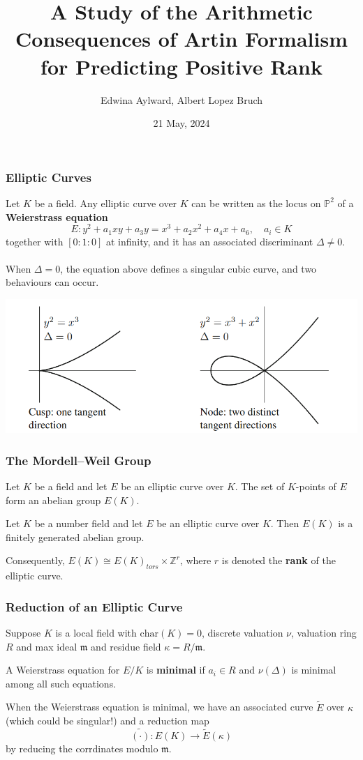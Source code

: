 \documentclass{beamer}
\title[Artin Formalism]{A Study of the Arithmetic Consequences of Artin Formalism for
Predicting Positive Rank}
\author{Edwina Aylward, Albert Lopez Bruch}
\date{21 May, 2024}
\newcommand{\ZZ}{\mathbb{Z}}
\theoremstyle{plain}
\begin{document}
\frame{\titlepage}

\begin{frame}
    \frametitle{Elliptic Curves}
    Let $K$ be a field. Any elliptic curve over $K$ can be written as the locus on $\mathbb{P}^2$ of a \textbf{Weierstrass equation}
    \begin{equation}
        E:y^2+a_1xy+a_3y=x^3+a_2x^2+a_4x+a_6,\quad a_i\in K
    \end{equation}
    together with $[0:1:0]$ at infinity, and it has an associated discriminant $\Delta\neq0$. 
    \\~\\
    When $\Delta=0$, the equation above defines a singular cubic curve, and two behaviours can occur.
    
    \centering
    \includegraphics[scale=0.4]{Singular_cubic.png}
\end{frame}

\begin{frame}
    \frametitle{The Mordell--Weil Group}
    Let $K$ be a field and let $E$ be an elliptic curve over $K$. The set of $K$-points of $E$ form an abelian group $E(K)$. 
    \begin{theorem}
        Let $K$ be a number field and let $E$ be an elliptic curve over $K$. Then $E(K)$ is a finitely generated abelian group.
    \end{theorem}
    Consequently, $E(K)\cong E(K)_{tors}\times\ZZ^r$, where $r$ is denoted the \textbf{rank} of the elliptic curve.

\end{frame}

\begin{frame}
    \frametitle{Reduction of an Elliptic Curve}
    Suppose $K$ is a local field with $\mathrm{char}(K)=0$, discrete valuation $\nu$, valuation ring $R$ and max ideal $\mathfrak{m}$ and residue field $\kappa=R/\mathfrak{m}$.
    \begin{definition}
        A Weierstrass equation for $E/K$ is \textbf{minimal} if $a_i\in R$ and $\nu(\Delta)$ is minimal among all such equations.
    \end{definition}
    When the Weierstrass equation is minimal, we have an associated curve $\tilde{E}$ over $\kappa$ (which could be singular!) and a reduction map 
    $$\widetilde{(\cdot)}:E(K)\longrightarrow \tilde{E}(\kappa)$$
    by reducing the corrdinates modulo $\mathfrak{m}$.
\end{frame}
\end{document}
